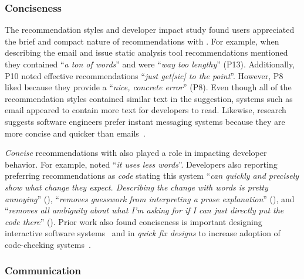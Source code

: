 \subsubsection{Conciseness}

The recommendation styles and developer impact study found users appreciated the brief and compact nature of recommendations with \suggs. For example, when describing the email and issue static analysis tool recommendations mentioned they contained ``\textit{a ton of words}'' and were ``\textit{way too lengthy}'' (P13). Additionally, P10 noted effective recommendations ``\textit{just get[sic] to the point}''. However, P8 liked \sugg because they provide a ``\textit{nice, concrete error}'' (P8). Even though all of the recommendation styles contained similar text in the suggestion, systems such as email appeared to contain more text for developers to read. Likewise, research suggests software engineers prefer instant messaging systems because they are more concise and quicker than emails~\cite{blatt2013email}.

\textit{Concise} recommendations with \suggs also played a role in impacting developer behavior. For example,  noted ``\textit{it uses less words}''. Developers also reporting preferring recommendations as \textit{code} stating this system ``\textit{can quickly and precisely show what change they expect. Describing the change with words is pretty annoying}'' (), ``\textit{removes guesswork from interpreting a prose explanation}'' (), and ``\textit{removes all ambiguity about what I'm asking for if I can just directly put the code there}'' (). Prior work also found conciseness is important designing interactive software systems~\cite{wasserman1981user} and in \textit{quick fix designs} to increase adoption of code-checking systems~\cite{Johnson2013Why}.

\subsubsection{Communication}


